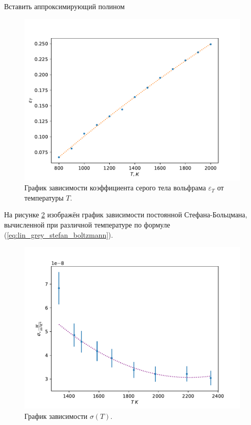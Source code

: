 \documentclass[10pt,a4paper]{article}
\begin{document}
\begin{multicols}{2}
	\Huge 
	\color{red}
	Вставить аппроксимирующий полином
	\color{black}
	\normalsize	
		
	\begin{figure}[H]
		\includegraphics[width=1\textwidth]{gen/fig-epsilon.pdf}
		\caption{График зависимости коэффициента серого тела вольфрама $\varepsilon_T$ от температуры $T$.}
		\label{fig:epsilon_T}
	\end{figure}	 
	
	На рисунке \ref{fig:sigma} изображён график зависимости постоянной Стефана-Больцмана, вычисленной при различной температуре по формуле (\ref{eq:lin_grey_stefan_boltzmann}).
	
	
	\begin{figure}[H]
		\includegraphics[width=1\textwidth]{gen/fig-sigma.pdf}
		\caption{График зависимости $\sigma(T)$.}
		\label{fig:sigma}
	\end{figure}	 
	

\end{multicols}
\end{document}
